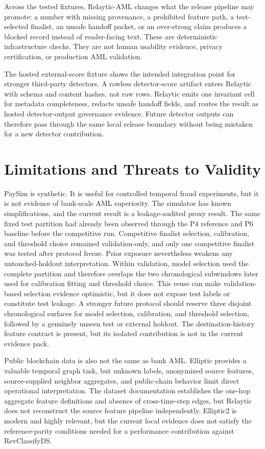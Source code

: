 \documentclass[11pt]{article}
\begin{document}
Across the tested fixtures, Relaytic-AML changes what the release pipeline may promote: a number with missing provenance, a prohibited feature path, a test-selected finalist, an unsafe handoff packet, or an over-strong claim produces a blocked record instead of reader-facing text. These are deterministic infrastructure checks. They are not human usability evidence, privacy certification, or production AML validation.

The hosted external-score fixture shows the intended integration point for stronger third-party detectors. A rowless detector-score artifact enters Relaytic with schema and content hashes, not raw rows. Relaytic emits one invariant cell for metadata completeness, redacts unsafe handoff fields, and routes the result as hosted detector-output governance evidence. Future detector outputs can therefore pass through the same local release boundary without being mistaken for a new detector contribution.

\section{Limitations and Threats to Validity}

PaySim is synthetic. It is useful for controlled temporal fraud experiments, but it is not evidence of bank-scale AML superiority. The simulator has known simplifications, and the current result is a leakage-audited proxy result. The same fixed test partition had already been observed through the P4 reference and P6 baseline before the competitive run. Competitive finalist selection, calibration, and threshold choice remained validation-only, and only one competitive finalist was tested after protocol freeze. Prior exposure nevertheless weakens any untouched-holdout interpretation. Within validation, model selection used the complete partition and therefore overlaps the two chronological subwindows later used for calibration fitting and threshold choice. This reuse can make validation-based selection evidence optimistic, but it does not expose test labels or constitute test leakage. A stronger future protocol should reserve three disjoint chronological surfaces for model selection, calibration, and threshold selection, followed by a genuinely unseen test or external holdout. The destination-history feature contract is present, but its isolated contribution is not in the current evidence pack.

Public blockchain data is also not the same as bank AML. Elliptic provides a valuable temporal graph task, but unknown labels, anonymized source features, source-supplied neighbor aggregates, and public-chain behavior limit direct operational interpretation. The dataset documentation establishes the one-hop aggregate feature definitions and absence of cross-time-step edges, but Relaytic does not reconstruct the source feature pipeline independently. Elliptic2 is modern and highly relevant, but the current local evidence does not satisfy the reference-parity conditions needed for a performance contribution against RevClassifyDS.
\end{document}
